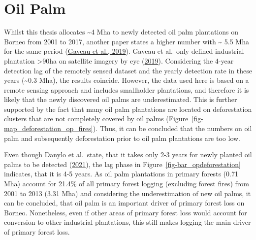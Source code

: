 \documentclass[
  letterpaper,
  DIV=11,
  numbers=noendperiod]{scrreprt}
\begin{document}
\hypertarget{oil-palm-3}{%
\section{Oil Palm}\label{oil-palm-3}}

Whilst this thesis allocates \textasciitilde4 Mha to newly detected oil
palm plantations on Borneo from 2001 to 2017, another paper states a
higher number with \textasciitilde{} 5.5 Mha for the same period
(\protect\hyperlink{ref-gaveauRiseFallForest2019}{Gaveau et al., 2019}).
Gaveau et al.~only defined industrial plantation \textgreater90ha on
satellite imagery by eye
(\protect\hyperlink{ref-gaveauRiseFallForest2019}{2019}). Considering
the 4-year detection lag of the remotely sensed dataset and the yearly
detection rate in these years (\textasciitilde0.3 Mha), the results
coincide. However, the data used here is based on a remote sensing
approach and includes smallholder plantations, and therefore it is
likely that the newly discovered oil palms are underestimated. This is
further supported by the fact that many oil palm plantations are located
on deforestation clusters that are not completely covered by oil palms
(Figure~\ref{fig-map_deforestation_op_fires}). Thus, it can be concluded
that the numbers on oil palm and subsequently deforestation prior to oil
palm plantations are too low.

Even though Danylo et al.~state, that it takes only 2-3 years for newly
planted oil palms to be detected
(\protect\hyperlink{ref-danyloMapExtentYear2021}{2021}), the lag phase
in Figure~\ref{fig-bar_opdeforestation} indicates, that it is 4-5 years.
As oil palm plantations in primary forests (0.71 Mha) account for 21.4\%
of all primary forest logging (excluding forest fires) from 2001 to 2013
(3.31 Mha) and considering the underestimation of new oil palms, it can
be concluded, that oil palm is an important driver of primary forest
loss on Borneo. Nonetheless, even if other areas of primary forest loss
would account for conversion to other industrial plantations, this still
makes logging the main driver of primary forest loss.
\end{document}
